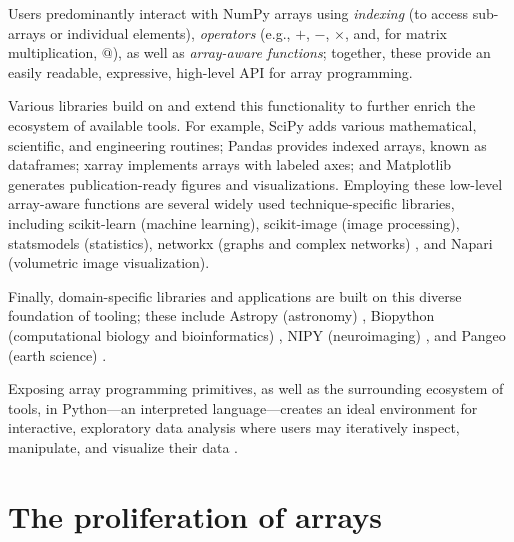 Users predominantly interact with NumPy arrays using {\em indexing} (to access
sub-arrays or individual elements), {\em operators} (e.g., $+$, $-$, $\times$,
and, for matrix multiplication, $@$), as well as {\em array-aware functions};
together, these provide an easily readable, expressive, high-level API for
array programming.

Various libraries build on and extend this functionality to further enrich the
ecosystem of available tools.  For example, SciPy adds various mathematical,
scientific, and engineering routines; Pandas provides indexed arrays, known as
dataframes; xarray implements arrays with labeled axes; and Matplotlib
generates publication-ready figures and visualizations.  Employing these
low-level array-aware functions are several widely used technique-specific libraries,
including scikit-learn (machine learning), scikit-image (image processing),
statsmodels (statistics),  networkx (graphs and complex networks) \cite{SciPyProceedings_11}, and Napari
(volumetric image visualization).

Finally, domain-specific libraries and applications are built on this diverse
foundation of tooling; these include Astropy (astronomy) \cite{astropy:2013,
astropy:2018}, Biopython (computational biology and bioinformatics) \cite{cock2009biopython},
NIPY (neuroimaging) \cite{millman2007analysis}, and Pangeo (earth science) \cite{2018EGUGA..2012146H}.

Exposing array programming primitives, as well as the surrounding ecosystem of
tools, in Python---an interpreted language---creates an ideal environment for
interactive, exploratory data analysis where users may iteratively inspect,
manipulate, and visualize their data \cite{perez2007ipython}.

\section*{The proliferation of arrays}


